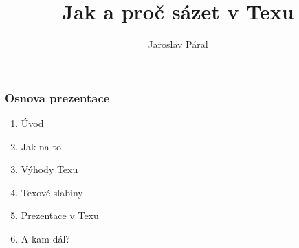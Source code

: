 \documentclass{beamer}
\author{Jaroslav Páral}
\institute[paral@robotikabrno.cz]{Pobočka Robotárna - Dům dětí a mládeže Brno, Helceletova\\[0.5cm]}
\title{Jak a proč sázet v Texu}
\begin{document}
\frame{\titlepage}

\begin{frame}
    \frametitle{Osnova prezentace}
    \begin{center}
		\begin{enumerate}
			\item Úvod
			\item Jak na to
			\item Výhody Texu
			\item Texové slabiny
			\item Prezentace v Texu
			\item A kam dál?
		\end{enumerate}
    \end{center}
\end{frame}
\end{document}
